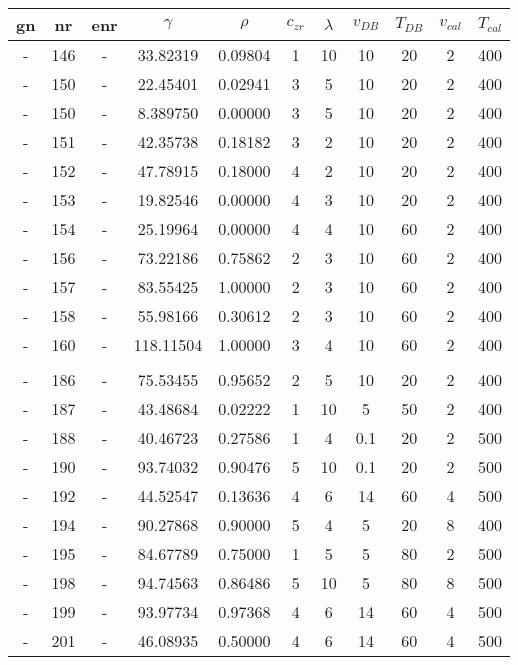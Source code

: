 \begin{table}[ht]
	\centering
	\label{tab:pre-emma}
	\begin{tabular}{ccccccccccc}
        \hline\hline
		gn  &nr	    &enr	&$\gamma$	&$\rho$	&$c_{zr}$	    &$\lambda$	&$v_{DB}$	&$T_{DB}$	&$v_{cal}$	&$T_{cal}$\\
        \hline
-	&146	&-	 &33.82319	&0.09804	&1	&10	&10	&20	&2	&400\\
-	&150	&-	 &22.45401	&0.02941	&3	&5	&10	&20	&2	&400\\
-	&150	&-	 &8.389750	&0.00000	&3	&5	&10	&20	&2	&400\\
-	&151	&-	 &42.35738	&0.18182	&3	&2	&10	&20	&2	&400\\
-	&152	&-	 &47.78915	&0.18000	&4	&2	&10	&20	&2	&400\\
-	&153	&-	 &19.82546	&0.00000	&4	&3	&10	&20	&2	&400\\
-	&154	&-	 &25.19964	&0.00000	&4	&4	&10	&60	&2	&400\\
-	&156	&-	 &73.22186	&0.75862	&2	&3	&10	&60	&2	&400\\
-	&157	&-	 &83.55425	&1.00000	&2	&3	&10	&60	&2	&400\\
-	&158	&-	 &55.98166	&0.30612	&2	&3	&10	&60	&2	&400\\
-	&160	&-	 &118.11504	&1.00000	&3	&4	&10	&60	&2	&400\\
   			   	&&&&&&&&&&\\
-	&186	&-	 &75.53455	&0.95652	&2	&5	&10	&20	&2	&400\\
-	&187	&-	 &43.48684	&0.02222	&1	&10	&5	&50	&2	&400\\
-	&188	&-	 &40.46723	&0.27586	&1	&4	&0.1	&20	&2	&500\\
-	&190	&-	 &93.74032	&0.90476	&5	&10	&0.1	&20	&2	&500\\
-	&192	&-	 &44.52547	&0.13636	&4	&6	&14	&60	&4	&500\\
-	&194	&-	 &90.27868	&0.90000	&5	&4	&5	&20	&8	&400\\
-	&195	&-	 &84.67789	&0.75000	&1	&5	&5	&80	&2	&500\\
-	&198	&-	 &94.74563	&0.86486	&5	&10	&5	&80	&8	&500\\
-	&199	&-	 &93.97734	&0.97368	&4	&6	&14	&60	&4	&500\\
-	&201	&-	 &46.08935	&0.50000	&4	&6	&14	&60	&4	&500\\
    \hline\hline
	\end{tabular}
\end{table}


